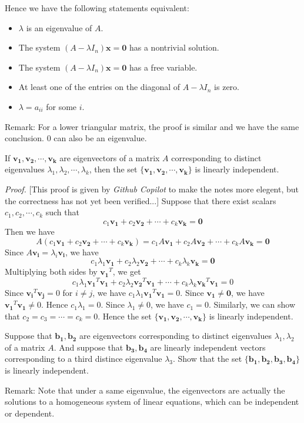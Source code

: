 \documentclass[10pt, a4paper]{article}
\newcommand{\vt}[1]{\mathbf{#1}}
\begin{document}
Hence we have the following statements equivalent:
\begin{itemize}
    \item $\lambda$ is an eigenvalue of $A$.
    \item The system $(A-\lambda I_n)\vt{x}=\vt{0}$ has a nontrivial solution.
    \item The system $(A-\lambda I_n)\vt{x}=\vt{0}$ has a free variable.
    \item At least one of the entries on the diagonal of $A-\lambda I_n$ is zero.
    \item $\lambda = a_{ii}$ for some $i$.
\end{itemize}
Remark: For a lower triangular matrix, the proof is similar and we have the same conclusion. 0 can also be an eigenvalue.

\begin{proposition}
    If $\vt{v_1}, \vt{v_2}, \cdots, \vt{v_k}$ are eigenvectors of a matrix $A$ corresponding to distinct eigenvalues $\lambda_1, \lambda_2, \cdots, \lambda_k$, then the set $\{\vt{v_1}, \vt{v_2}, \cdots, \vt{v_k}\}$ is linearly independent.
\end{proposition}
\textit{Proof.} [This proof is given by \textit{Github Copilot} to make the notes more elegent, but the correctness has not yet been verified...] Suppose that there exist scalars $c_1, c_2, \cdots, c_k$ such that \[
c_1\vt{v_1}+c_2\vt{v_2}+\cdots+c_k\vt{v_k}=\vt{0}
\]
Then we have \[
A(c_1\vt{v_1}+c_2\vt{v_2}+\cdots+c_k\vt{v_k})=c_1A\vt{v_1}+c_2A\vt{v_2}+\cdots+c_kA\vt{v_k}=\vt{0}
\]
Since $A\vt{v_i}=\lambda_i\vt{v_i}$, we have \[
c_1\lambda_1\vt{v_1}+c_2\lambda_2\vt{v_2}+\cdots+c_k\lambda_k\vt{v_k}=\vt{0}
\]
Multiplying both sides by $\vt{v_1}^T$, we get \[
c_1\lambda_1\vt{v_1}^T\vt{v_1}+c_2\lambda_2\vt{v_2}^T\vt{v_1}+\cdots+c_k\lambda_k\vt{v_k}^T\vt{v_1}=0
\]
Since $\vt{v_i}^T\vt{v_j}=0$ for $i\neq j$, we have $c_1\lambda_1\vt{v_1}^T\vt{v_1}=0$. Since $\vt{v_1}\neq \vt{0}$, we have $\vt{v_1}^T\vt{v_1}\neq 0$. Hence $c_1\lambda_1=0$. Since $\lambda_1\neq 0$, we have $c_1=0$. Similarly, we can show that $c_2=c_3=\cdots=c_k=0$. Hence the set $\{\vt{v_1}, \vt{v_2}, \cdots, \vt{v_k}\}$ is linearly independent.

\begin{example}
    Suppose that $\vt{b_1}, \vt{b_2}$ are eigenvectors corresponding to distinct eigenvalues $\lambda_1, \lambda_2$ of a matrix $A$. 
    And suppose that $\vt{b_3},\vt{b_4}$ are linearly independent vectors corresponding to a third distince eigenvalue $\lambda_3$.
    Show that the set $\{\vt{b_1}, \vt{b_2}, \vt{b_3}, \vt{b_4}\}$ is linearly independent.
\end{example}
\indent Remark: Note that under a same eigenvalue, the eigenvectors are actually the solutions to a homogeneous system of linear equations, which can be independent or dependent.
\end{document}
